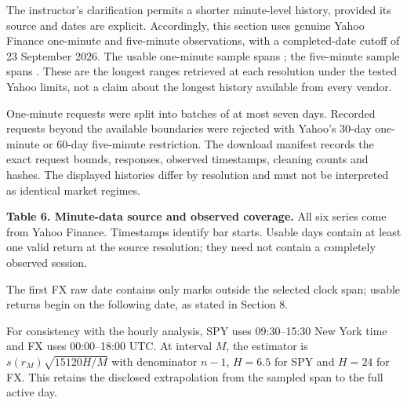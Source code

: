 \clearpage
{}
The instructor's clarification permits a shorter minute-level history, provided its source and dates are explicit. Accordingly, this section uses genuine Yahoo Finance one-minute and five-minute observations, with a completed-date cutoff of 23 September 2026. The usable one-minute sample spans \textbf{\MinuteOneRange}; the five-minute sample spans \textbf{\MinuteFiveRange}. These are the longest ranges retrieved at each resolution under the tested Yahoo limits, not a claim about the longest history available from every vendor.

One-minute requests were split into batches of at most seven days. Recorded requests beyond the available boundaries were rejected with Yahoo's 30-day one-minute or 60-day five-minute restriction. The download manifest records the exact request bounds, responses, observed timestamps, cleaning counts and hashes. The displayed histories differ by resolution and must not be interpreted as identical market regimes.

\clearpage
{}
\textbf{Table 6. Minute-data source and observed coverage.} All six series come from Yahoo Finance. Timestamps identify bar starts. Usable days contain at least one valid return at the source resolution; they need not contain a completely observed session.
\begin{center}\small\end{center}
The first FX raw date contains only marks outside the selected clock span; usable returns begin on the following date, as stated in Section 8.

For consistency with the hourly analysis, SPY uses 09:30--15:30 New York time and FX uses 00:00--18:00 UTC. At interval $M$, the estimator is $s(r_M)\sqrt{15120H/M}$ with denominator $n-1$, $H=6.5$ for SPY and $H=24$ for FX. This retains the disclosed extrapolation from the sampled span to the full active day.

